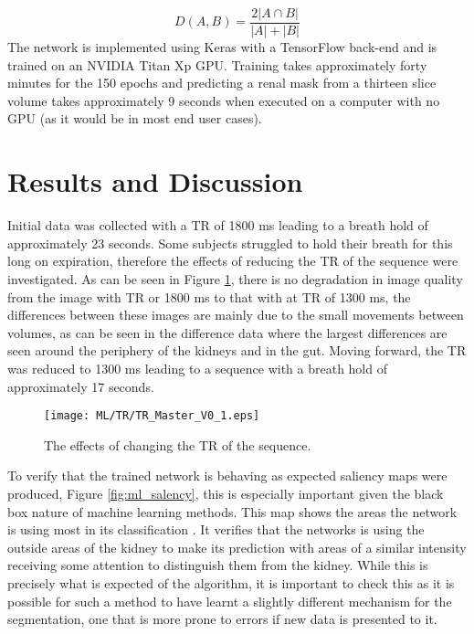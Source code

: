 \begin{equation}
D\left(A, B\right) = \frac{2\left| A \cap B \right|}{\left|A\right|+\left|B\right|}
\label{eq:dice}
\end{equation}
The network is implemented using Keras \cite{chollet_keras_2015} with a TensorFlow \cite{abadi_tensorflow_2015, martin_abad_tensorflow_2019} back-end and is trained on an NVIDIA Titan Xp \ac{GPU}. Training takes approximately forty minutes for the 150 epochs and predicting a renal mask from a thirteen slice volume takes approximately 9 seconds when executed on a computer with no \ac{GPU} (as it would be in most end user cases).

\newpage
\section{Results and Discussion}

Initial data was collected with a \ac{TR} of 1800 ms leading to a breath hold of approximately 23 seconds. Some subjects struggled to hold their breath for this long on expiration, therefore the effects of reducing the \ac{TR} of the sequence were investigated. As can be seen in Figure \ref{fig:ml_tr}, there is no degradation in image quality from the image with \ac{TR} or 1800 ms to that with at \ac{TR} of 1300 ms, the differences between these images are mainly due to the small movements between volumes, as can be seen in the difference data where the largest differences are seen around the periphery of the kidneys and in the gut. Moving forward, the \ac{TR} was reduced to 1300 ms leading to a sequence with a breath hold of approximately 17 seconds.

\begin{figure}[H]
	\centering
	\texttt{[image: ML/TR/TR\_Master\_V0\_1.eps]}
	\caption{The effects of changing the \ac{TR} of the sequence.}
	\label{fig:ml_tr}	
\end{figure}

To verify that the trained network is behaving as expected saliency maps were produced, Figure \ref{fig:ml_salency}, this is especially important given the black box nature of machine learning methods. This map shows the areas the network is using most in its classification \cite{mahapatra_visual_2016}. It verifies that the networks is using the outside areas of the kidney to make its prediction with areas of a similar intensity receiving some attention to distinguish them from the kidney. While this is precisely what is expected of the algorithm, it is important to check this as it is possible for such a method to have learnt a slightly different mechanism for the segmentation, one that is more prone to errors if new data is presented to it.

